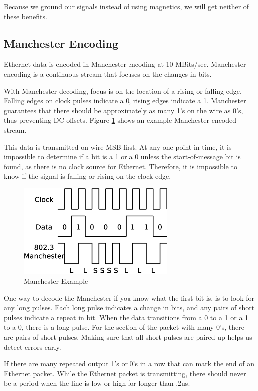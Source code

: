 \documentclass[13pt]{ltxdoc}
\begin{document}
Because we ground our signals instead of using magnetics, we will get neither of these
benefits.

\subsection{Manchester Encoding}
Ethernet data is encoded in Manchester encoding at 10 MBits/sec.  Manchester encoding
is a continuous stream that focuses on the changes in bits.

With Manchester decoding, focus is on the location of a rising or falling edge.  Falling 
edges on clock pulses indicate a 0, rising edges indicate a 1.  Manchester guarantees that there
should be approximately as many 1's on the wire as 0's, thus preventing DC offsets.  Figure \ref{manchester}
shows an example Manchester encoded stream.  

This data is transmitted on-wire MSB first.  At any one point in time, it is impossible to
determine if a bit is a 1 or a 0 unless the start-of-message bit is found, as there is no
clock source for Ethernet.  Therefore, it is impossible to know if the signal is falling or
rising on the clock edge.


\begin{figure}
    \centering
    \includegraphics[width=3.0in]{manchester}
    \caption{Manchester Example}
    \label{manchester}
\end{figure}

One way to decode the Manchester if you know what the first bit is, is to look for any long pulses.
Each long pulse indicates a change in bits, and any pairs of short pulses indicate a repeat in bit. 
When the data transitions from a 0 to a 1 or a 1 to a 0, there is a long pulse. For
the section of the packet with many 0's, there are pairs of short pulses.  Making sure that all
short pulses are paired up helps us detect errors early. 

If there are many repeated output 1's or 0's in a row that can mark the end of an Ethernet packet.
While the Ethernet packet is transmitting, there should never be a period when the line is low
or high for longer than .2us.
\end{document}
